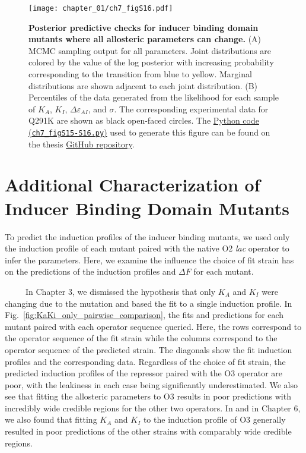 \documentclass[12pt]{caltech_thesis}
\begin{document}
\hypertarget{fig:kaki_epai_post_predictive}{%
\begin{figure}
\centering
\texttt{[image: chapter\_01/ch7\_figS16.pdf]}
\caption[{Posterior predictive checks for inducer binding domain mutants
where all allosteric parameter can change.}]{\textbf{Posterior
predictive checks for inducer binding domain mutants where all
allosteric parameters can change.} (A) MCMC sampling output for all
parameters. Joint distributions are colored by the value of the log
posterior with increasing probability corresponding to the transition
from blue to yellow. Marginal distributions are shown adjacent to each
joint distribution. (B) Percentiles of the data generated from the
likelihood for each sample of \(K_A\), \(K_I\),
\(\Delta\varepsilon_{AI}\), and \(\sigma\). The corresponding
experimental data for Q291K are shown as black open-faced circles. The
\href{https://github.com/gchure/phd/blob/master/src/chapter_07/code/ch7_figS15-S16.py}{Python
code (\texttt{ch7\_figS15-S16.py})} used to generate this figure can be
found on the thesis \href{https://github.com/gchure/phd}{GitHub
repository}.}
\label{fig:kaki_epai_post_predictive}
\end{figure}
}

\hypertarget{additional-characterization-of-inducer-binding-domain-mutants}{%
\section{Additional Characterization of Inducer Binding Domain
Mutants}\label{additional-characterization-of-inducer-binding-domain-mutants}}

To predict the induction profiles of the inducer binding mutants, we
used only the induction profile of each mutant paired with the native O2
\emph{lac} operator to infer the parameters. Here, we examine the
influence the choice of fit strain has on the predictions of the
induction profiles and \(\Delta F\) for each mutant.

~~~~~In Chapter 3, we dismissed the hypothesis that only \(K_A\) and
\(K_I\) were changing due to the mutation and based the fit to a single
induction profile. In Fig.~\ref{fig:KaKi_only_pairwise_comparison}, the
fits and predictions for each mutant paired with each operator sequence
queried. Here, the rows correspond to the operator sequence of the fit
strain while the columns correspond to the operator sequence of the
predicted strain. The diagonals show the fit induction profiles and the
corresponding data. Regardless of the choice of fit strain, the
predicted induction profiles of the repressor paired with the O3
operator are poor, with the leakiness in each case being significantly
underestimated. We also see that fitting the allosteric parameters to O3
results in poor predictions with incredibly wide credible regions for
the other two operators. In \textcite{razo-mejia2018} and in Chapter 6,
we also found that fitting \(K_A\) and \(K_I\) to the induction profile
of O3 generally resulted in poor predictions of the other strains with
comparably wide credible regions.
\end{document}
